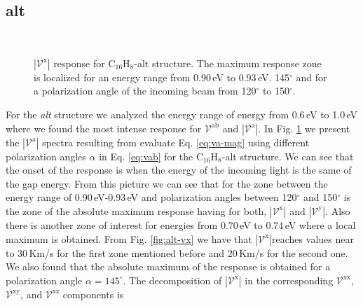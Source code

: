 \documentclass[prb,11pt,tightenlines,twocolumn,aps]{revtex4-1}
\begin{document}
\subsection{alt} %
\label{sec:results-alt}
\begin{figure}[tb]
    \centering
    \label{fig:alt-vx}
    \\
    \label{fig:alt-vy}
    \caption{$|\mathcal{V}^{\mathrm{x}}|$ response for C$_{16}$H$_{8}$-alt
    structure. The maximum response zone is localized for an energy range from
    0.90\,eV to 0.93\,eV. 145$^{\circ}$ and for a polarization angle of the
    incoming beam from 120$^{\circ}$ to 150$^{\circ}$.}
    \label{fig:alt-vab-mag}
\end{figure}
For the \emph{alt} structure we analyzed the energy range of energy from
0.6\,eV to 1.0\,eV where we found the most intense response for
$\mathcal{V}^{\mathrm{ab}}$ and $|\mathcal{V}^{\mathrm{a}}|$. In Fig. 
\ref{fig:alt-vab-mag} we present the $|\mathcal{V}^{\mathrm{a}}|$ spectra
resulting from evaluate Eq. \eqref{eq:va-mag} using different polarization
angles $\alpha$ in Eq. \eqref{eq:vab} for the C$_{16}$H$_{8}$-alt structure. We
can see that the onset of the response is when the energy of the incoming light
is the same of the gap energy.
%
From this picture we can see that for the zone between the energy range of
0.90\,eV-0.93\,eV and polarization angles between 120$^{\circ}$ and
150$^{\circ}$ is the zone of the absolute maximum response having for both,
$|\mathcal{V}^{\mathrm{x}}|$ and $|\mathcal{V}^{\mathrm{y}}|$. Also there is
another zone of interest for energies from 0.70\,eV to 0.74\,eV where a local
maximum is obtained.
%
From Fig. \ref{fig:alt-vx} we have that $|\mathcal{V}^{\mathrm{x}}|$reaches
values near to 30\,Km/s for the first zone mentioned before and 20\,Km/s for
the second one. 
%
We also found that the absolute maximum of the response is obtained for a
polarization angle $\alpha = 145^{\circ}$. The decomposition of
$|\mathcal{V}^{\mathrm{x}}|$ in the corresponding $\mathcal{V}^{\mathrm{xx}}$,
$\mathcal{V}^{\mathrm{xy}}$, and $\mathcal{V}^{\mathrm{xz}}$ components is
\end{document}
